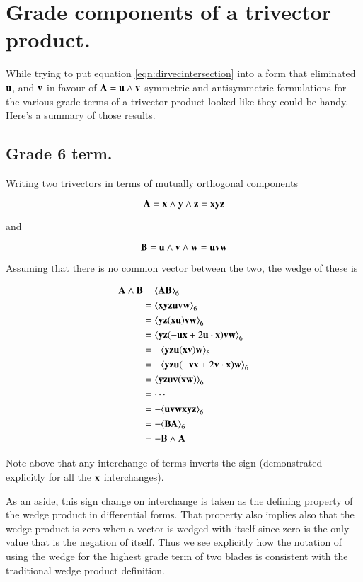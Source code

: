 \documentclass{article}      %
\newcommand{\gpgrade}[2] {{\left\langle{{#1}}\right\rangle}_{#2}}
\begin{document}
\section{ Grade components of a trivector product. }

While trying to put equation \ref{eqn:dirvecintersection} into a form
that eliminated $\mathbf{u}$, and $\mathbf{v}$ in favour of $\mathbf{A} = \mathbf{u} \wedge \mathbf{v}$
symmetric and antisymmetric formulations for the various grade terms
of a trivector product looked like they could be handy.  Here's a summary
of those results.

\subsection{ Grade 6 term. }

Writing two trivectors in terms
of mutually orthogonal components

\[
\mathbf{A} = \mathbf{x} \wedge \mathbf{y} \wedge \mathbf{z} = \mathbf{x}\mathbf{y}\mathbf{z}
\]

and

\[
\mathbf{B} = \mathbf{u} \wedge \mathbf{v} \wedge \mathbf{w} =\mathbf{u}\mathbf{v}\mathbf{w}
\]

Assuming that there is no common vector between the two, the 
wedge of these is

\begin{align*}
\BA \wedge \BB 
&= \gpgrade{\BA\BB}{6} \\
&= \gpgrade{\Bx\By\Bz\Bu\Bv\Bw}{6} \\
&= \gpgrade{\By\Bz(\Bx\Bu)\Bv\Bw}{6} \\
&= \gpgrade{\By\Bz(-\Bu\Bx + 2\Bu \cdot \Bx)\Bv\Bw}{6} \\
&= -\gpgrade{\By\Bz\Bu(\Bx\Bv)\Bw}{6} \\
&= -\gpgrade{\By\Bz\Bu(-\Bv\Bx + 2\Bv \cdot \Bx)\Bw}{6} \\
&= \gpgrade{\By\Bz\Bu\Bv(\Bx\Bw)}{6} \\
&= \cdots \\
&= -\gpgrade{\Bu\Bv\Bw\Bx\By\Bz}{6} \\
&= -\gpgrade{\BB\BA}{6} \\
&= -\BB \wedge \BA
\end{align*}

Note above that any interchange of terms inverts the sign (demonstrated 
explicitly for all the $\mathbf{x}$ interchanges).

As an aside, this
sign change on interchange is taken as the defining property of the 
wedge product in differential forms.  That property also
implies also that the wedge product is
zero when a vector is wedged with itself since zero is the only
value that is the negation of itself.  Thus we see explicitly
how the notation of using the wedge for the highest grade term
of two blades is consistent with the traditional
wedge product definition.
\end{document}
